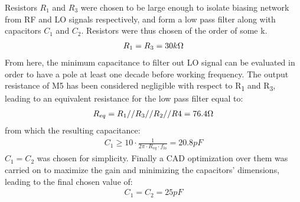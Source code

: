 Resistors \(R_1\) and \(R_3\) were chosen to be large enough to isolate biasing network from RF and LO signals respectively, and form a low pass filter along with capacitors \(C_1\) and \(C_2\). Resistors were thus chosen of the order of some k\ohm.
\begin{align}
	R_1=R_3=30k\ohm \nonumber
\end{align}
From here, the minimum capacitance to filter out LO signal can be evaluated in order to have a pole at least one decade before working frequency. The output resistance of M5 has been considered negligible with respect to R\textsubscript{1} and R\textsubscript{3}, leading to an equivalent resistance for the low pass filter equal to:
\begin{align}
	R_{eq}=R_1//R_3//R_2//R4=76.4 \ohm \nonumber
\end{align}
from which the resulting capacitance:
\begin{align}
	C_1\ge 10\cdot \frac{1}{2\pi \cdot R_{eq} \cdot f_{lo }} = 20.8pF
\end{align}
\(C_1 = C_2\) was chosen for simplicity. Finally a CAD optimization over them was carried on to maximize the gain and minimizing the capacitors' dimensions, leading to the final chosen value of:
\begin{align}
	C_1=C_2=25pF
\end{align}